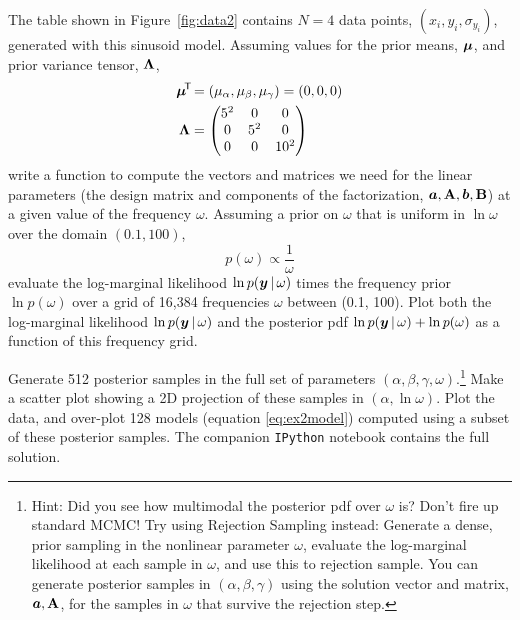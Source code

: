 The table shown in Figure~\ref{fig:data2} contains $N=4$ data points, $(x_i,
y_i, \sigma_{y_i})$, generated with this sinusoid model.
Assuming values for the prior means, $\boldsymbol{\mu}$, and prior variance tensor,
$\mathbf{\Lambda}$,
\begin{align}
  \boldsymbol{\mu}^{\!\mathsf{T}\!} &= (\mu_\alpha, \mu_\beta, \mu_\gamma) = (0, 0, 0)\\
  \mathbf{\Lambda} &=
    \begin{pmatrix}
      5^2 & 0 & 0\\
      0 & 5^2 & 0\\
      0 & 0 & 10^2
    \end{pmatrix}
\end{align}
write a function to compute the vectors and matrices we need for the linear
parameters (the design matrix and components of the factorization, $\boldsymbol{a}, \mathbf{A},
\boldsymbol{b}, \mathbf{B}$) at a given value of the frequency $\omega$.
Assuming a prior on $\omega$ that is uniform in $\ln\omega$ over the domain
$(0.1, 100)$,
\begin{equation}
  p(\omega) \propto \frac{1}{\omega}
\end{equation}
evaluate the log-marginal likelihood $\ln p(\boldsymbol{y}\,|\,\omega)$ times the
frequency prior $\ln p(\omega)$ over a grid of 16,384 frequencies $\omega$
between (0.1, 100).
Plot both the log-marginal likelihood $\ln p(\boldsymbol{y}\,|\,\omega)$ and the posterior
pdf $\ln p(\boldsymbol{y}\,|\,\omega) + \ln p(\omega)$ as a function of this frequency
grid.

Generate 512 posterior samples in the full set of parameters $(\alpha, \beta,
\gamma, \omega)$.\footnote{Hint: Did you see how multimodal the posterior pdf
over $\omega$ is? Don't fire up standard MCMC! Try using Rejection Sampling
instead: Generate a dense, prior sampling in the nonlinear parameter $\omega$,
evaluate the log-marginal likelihood at each sample in $\omega$, and use this to
rejection sample. You can generate posterior samples in $(\alpha, \beta,
\gamma)$ using the solution vector and matrix, $\boldsymbol{a}, \mathbf{A}$, for the samples in
$\omega$ that survive the rejection step.}
Make a scatter plot showing a 2D projection of these samples in $(\alpha, \ln
\omega)$.
Plot the data, and over-plot 128 models (equation \ref{eq:ex2model}) computed
using a subset of these posterior samples.
The companion \texttt{IPython} notebook contains the full solution.

